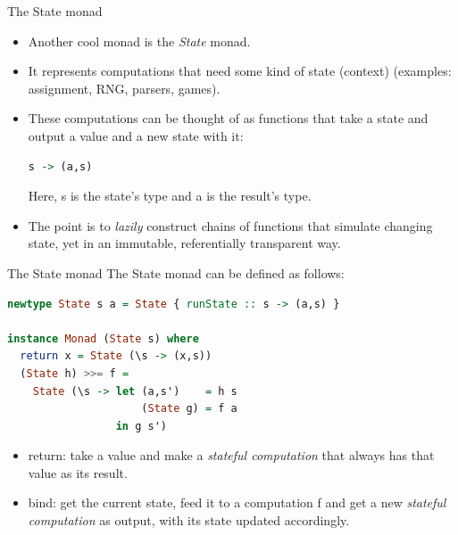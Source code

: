 \documentclass{beamer}
\begin{document}
\begin{frame}[fragile]{The State monad}
    \begin{itemize}
        \item Another cool monad is the \textit{State} monad.
        \item It represents computations that need some kind of state
              (context) (examples: assignment, RNG, parsers, games).
        \item These computations can be thought of as functions that
              take a state and output a value and a new state with it:

        \begin{minipage}{\linewidth} \hspace{1cm}
        \begin{lstlisting}[language=haskell, numbers=none, frame=none]
               s -> (a,s)
        \end{lstlisting}
        \end{minipage} \hspace{1cm}

             Here, s is the state's type and a is the result's type.
        \item The point is to \textit{lazily} construct chains of
              functions that simulate changing state, yet in an
              immutable, referentially transparent way.
    \end{itemize}
\end{frame}

\begin{frame}[fragile]{The State monad}
    The State monad can be defined as follows:

    \begin{minipage}{\linewidth} \hspace{1cm}
    \begin{lstlisting}[language=haskell, numbers=none, frame=none]
newtype State s a = State { runState :: s -> (a,s) }

instance Monad (State s) where
  return x = State (\s -> (x,s))
  (State h) >>= f =
    State (\s -> let (a,s')    = h s
                     (State g) = f a
                 in g s')
    \end{lstlisting}
    \end{minipage} \hspace{1cm}

    \begin{itemize}
        \item return: take a value and make a \textit{stateful computation}
              that always has that value as its result.
        \item bind: get the current state, feed it to a computation f and
              get a new \textit{stateful computation} as output, with its
              state updated accordingly.
    \end{itemize}
\end{frame}
\end{document}
